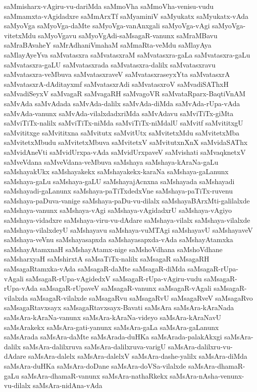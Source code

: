 {saMmisharx-vAgiru-vu-dariMda
saMmoVha
saMmoVha-venisu-vudu
saMmamxta-vAgidadxre
saMmArxTf
saMyaminiV
saMyukatx
saMyukatx-vAda
saMyoVga
saMyoVga-daMte
saMyoVga-vanAnxgali
saMyoVga-vAgi
saMyoVga-vitetxMdu
saMyoVgavu
saMyoVgAdi-saMsagaR-vanunx
saMraMBavu
saMraBAvaheY
saMrAdhaniVmahaM
saMmaRta-veMdu
saMlayAya
saMlayAyeYva
saMvatasxra
saMvatasxraM
saMvatasxra-gaLa
saMvatasxra-gaLu
saMvatasxra-gaLU
saMvatasxrada
saMvatasxra-dalilx
saMvatasxravu
saMvatasxra-veMbuva
saMvatasxraveV
saMvatasxraseyxYta
saMvatasxrA
saMvatasxrA-dAditayxmf
saMvatasxrAdi
saMvatasxroV
saMvadiSAThxH
saMvadiSeyxV
saMvagaR
saMvagaRH
saMvagoVR
saMvataRparx-BaqtiVnAM
saMvAda
saMvAdada
saMvAda-dalilx
saMvAda-diMda
saMvAda-rUpa-vAda
saMvAda-vanunx
saMvAda-vilalxdadxriMda
saMvAdavu
saMviTiTx-giMta
saMviTiTx-nalilx
saMviTiTx-niMda
saMviTiTx-niMdalU
saMvitf
saMvititxgU
saMvititxge
saMvititxna
saMvitutx
saMvitUtx
saMvitetxMdu
saMvitetxMba
saMvitetxMbudu
saMvitetxMbuva
saMvitetxV
saMvitutxnXnX
saMvidaSAThx
saMvidAneVti
saMvidUrxpa-vAda
saMvidUrxpaveV
saMvishati
saMvaqknetxV
saMveVdana
saMveVdana-veMbuva
saMshaya
saMshaya-kAraNa-gaLu
saMshayakUkx
saMshayakekx
saMshayakekx-karaNa
saMshaya-gaLanunx
saMshaya-gaLu
saMshaya-gaLU
saMshayajAcnxna
saMshayada
saMshayadi
saMshayadi-gaLanunx
saMshaya-paTiTxdedxVne
saMshaya-paTiTx-ruvenu
saMshaya-paDuva-vanige
saMshaya-paDu-vu-dilalx
saMshayaBArxMti-galilalxde
saMshaya-vanunx
saMshaya-vAgi
saMshaya-vAgidadxrU
saMshaya-vAgiyo
saMshaya-vidadxre
saMshaya-viru-vu-dAdare
saMshaya-vilalx
saMshaya-vilalxde
saMshaya-vilalxdeyU
saMshayavu
saMshaya-vuMTAgi
saMshayavU
saMshayaveV
saMshaya-veVnu
saMshayasapxda
saMshayasapxda-vAda
saMshayAtamxka
saMshayAtamxnaH
saMshayAtamx-nige
saMshoVdhana
saMshoVdhane
saMsharxyaH
saMshirxtA
saMsaTiTx-nalilx
saMsagaR
saMsagaRH
saMsagaRtamxka-vAda
saMsagaR-daMte
saMsagaR-diMda
saMsagaR-rUpa-vAgali
saMsagaR-rUpa-vAgidedxV
saMsagaR-rUpa-vAgiru-vudu
saMsagaR-rUpa-vAda
saMsagaR-rUpaveV
saMsagaR-vanunx
saMsagaR-vAgali
saMsagaR-vilalxda
saMsagaR-vilalxde
saMsagaRvu
saMsagaRvU
saMsagaRveV
saMsagaRvo
saMsagaRtavxsayx
saMsagaRtavxsayx-Bavati
saMsAra
saMsAra-kAraNada
saMsAra-kAraNa-vanunx
saMsAra-kAraNa-videyo
saMsAra-kAraNavU
saMsArakekx
saMsAra-gati-yanunx
saMsAra-gaLa
saMsAra-gaLanunx
saMsArada
saMsAra-daMte
saMsArada-duHKa
saMsArada-palakAkxgi
saMsAra-dalilx
saMsAra-dalilxruva
saMsAra-dalilxruva-varigU
saMsAra-dalilxru-vu-dAdare
saMsAra-dalelx
saMsAra-dalelxV
saMsAra-dashe-yalilx
saMsAra-diMda
saMsAra-duHKa
saMsAra-doDane
saMsAra-doVSa-vilalxde
saMsAra-dhamaR-gaLu
saMsAra-dhamaR-vanunx
saMsAra-nathaRkekx
saMsAra-nAsha-venunx-vu-dilalx
saMsAra-nidAna-vAda
}
